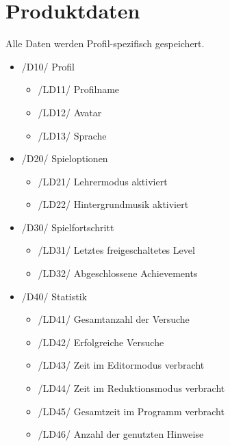 \section{Produktdaten}

Alle Daten werden Profil-spezifisch gespeichert.

\begin{itemize}

\item /D10/ Profil
\begin{itemize}
\item /LD11/ Profilname
\item /LD12/ Avatar
\item /LD13/ Sprache
\end{itemize}

\item /D20/ Spieloptionen
\begin{itemize}
\item /LD21/ Lehrermodus aktiviert
\item /LD22/ Hintergrundmusik aktiviert
\end{itemize}

\item /D30/ Spielfortschritt
\begin{itemize}
\item /LD31/ Letztes freigeschaltetes Level
\item /LD32/ Abgeschlossene Achievements
\end{itemize}

\item /D40/ Statistik
\begin{itemize}
\item /LD41/ Gesamtanzahl der Versuche
\item /LD42/ Erfolgreiche Versuche
\item /LD43/ Zeit im Editormodus verbracht
\item /LD44/ Zeit im Reduktionsmodus verbracht
\item /LD45/ Gesamtzeit im Programm verbracht
\item /LD46/ Anzahl der genutzten Hinweise
\end{itemize}

\end{itemize}